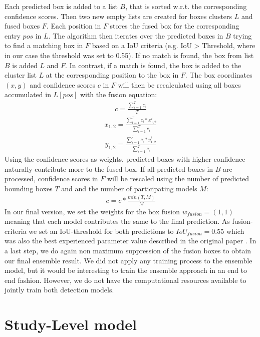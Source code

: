 Each predicted box is added to a list $B$, that is sorted w.r.t. the corresponding confidence scores. Then two new empty lists are created for boxes clusters $L$ and fused boxes $F$. Each position in $F$ stores the fused box for the corresponding entry $pos$ in $L$. The algorithm then iterates over the predicted boxes in $B$ trying to find a matching box in $F$ based on a \ac{IoU} criteria (e.g. IoU > Threshold, where in our case the threshold was set to 0.55). If no match is found, the box from list $B$ is added $L$ and $F$. In contrast, if a match is found, the box is added to the cluster list $L$ at the corresponding position to the box in $F$. The box coordinates $(x,y)$ and confidence scores $c$ in $F$ will then be recalculated using all boxes accumulated in $L[pos]$ with the fusion equation:
\begin{align}
	c = \frac{\sum_{i=1}^{T}c_i}{T}
\end{align}
\begin{align}
	x_{1,2} = \frac{\sum_{i=1}^{T} c_i * x_{1,2}^i}{\sum_{i=1}^{T} c_i}
\end{align}
\begin{align}
	y_{1,2} = \frac{\sum_{i=1}^{T} c_i * y_{1,2}^i}{\sum_{i=1}^{T} c_i}
\end{align}
Using the confidence scores as weights, predicted boxes with higher confidence naturally contribute more to the fused box.
If all predicted boxes in $B$ are processed, confidence scores in $F$ will be rescaled using the number of predicted bounding boxes $T$ and and the number of participating models $M$:
\begin{align}
	c = c * \frac{min(T,M)}{M}
\end{align}
In our final version, we set the weights for the box fusion $w_{fusion} = (1,1)$ meaning that each model contributes the same to the final prediction.
As fusion-criteria we set an \ac{IoU}-threshold for both predictions to $IoU_{fusion} = 0.55$ which was also the best experienced parameter value described in the original paper \autocite{weightedBoxFusion}. In a last step, we do again non maximum suppression of the fusion boxes to obtain our final ensemble result. 
We did not apply any training process to the ensemble model, but it would be interesting to train the ensemble approach in an end to end fashion. However, we do not have the computational resources available to jointly train both detection models.



\section{Study-Level model}

